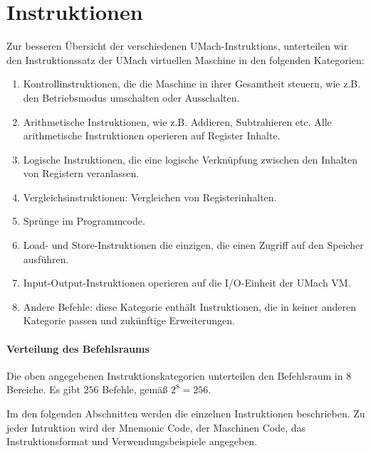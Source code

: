 \section{Instruktionen}

Zur besseren Übersicht der verschiedenen UMach-\glspl{Instruktion}, unterteilen
wir den \gls{Instruktionssatz} der UMach virtuellen Maschine in den folgenden
Kategorien:

\begin{enumerate}
  \item Kontrollinstruktionen,  die die Maschine in ihrer Gesamtheit
    steuern, wie z.B. den Betriebsmodus umschalten oder Ausschalten.
  \item Arithmetische Instruktionen, wie z.B. Addieren, Subtrahieren etc.
    Alle arithmetische Instruktionen operieren auf Register Inhalte.
  \item Logische Instruktionen, die eine logische Verknüpfung zwischen den Inhalten
    von Registern veranlassen.
  \item Vergleichsinstruktionen: Vergleichen von Registerinhalten.
  \item Sprünge im Programmcode.
  \item Load- und Store-Instruktionen die einzigen, die einen Zugriff auf den
    Speicher ausführen.
  \item Input-Output-Instruktionen operieren auf die I/O-Einheit der UMach VM.
  \item Andere Befehle: diese Kategorie enthält Instruktionen, die in keiner
    anderen Kategorie passen und zukünftige Erweiterungen.
\end{enumerate}

\paragraph{Verteilung des Befehlsraums}
Die oben angegebenen Instruktionskategorien unterteilen den \gls{Befehlsraum} in
8 Bereiche.
Es gibt $256$ Befehle, gemäß $2^{8} = 256$.


Im den folgenden Abschnitten werden die einzelnen Instruktionen beschrieben.
Zu jeder Intruktion wird der \glqq Mnemonic Code\grqq, der Maschinen Code, das
Instruktionsformat und Verwendungsbeispiele angegeben.




